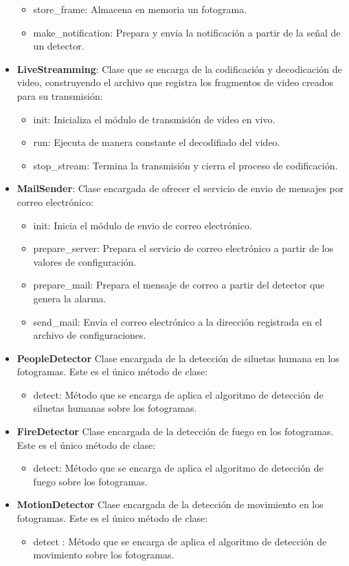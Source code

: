 \begin{itemize}
\begin{itemize}
            \item store\_frame: Almacena en memoria un fotograma.
            \item make\_notification: Prepara y envia la notificación a partir de la señal de un detector.
        \end{itemize}
    \item \textbf{LiveStreamming}: Clase que se encarga de la codificación y decodicación de video, construyendo el archivo que registra los fragmentos de video creados para su transmisión:
        \begin{itemize}
            \item init: Inicializa el módulo de transmisión de video en vivo.
            \item run: Ejecuta de manera constante el decodifiado del video.
            \item stop\_stream: Termina la transmisión y cierra el proceso de codificación.
        \end{itemize}
    \item \textbf{MailSender}: Clase encargada de ofrecer el servicio de envio de mensajes por correo electrónico:
        \begin{itemize}
            \item init: Inicia el módulo de envio de correo electrónico.
            \item prepare\_server: Prepara el servicio de correo electrónico a partir de los valores de configuración.
            \item prepare\_mail: Prepara el mensaje de correo a partir del detector que genera la alarma.
            \item send\_mail: Envia el correo electrónico a la dirección registrada en el archivo de configuraciones.
        \end{itemize}
    \item \textbf{PeopleDetector} Clase encargada de la detección de siluetas humana en los fotogramas. Este es el único método de clase:
        \begin{itemize}
            \item detect: Método que se encarga de aplica el algoritmo de detección de siluetas humanas sobre los fotogramas.
        \end{itemize}
    \item \textbf{FireDetector} Clase encargada de la detección de fuego en los fotogramas. Este es el único método de clase:
        \begin{itemize}
            \item detect: Método que se encarga de aplica el algoritmo de detección de fuego sobre los fotogramas.
        \end{itemize}
    \item \textbf{MotionDetector} Clase encargada de la detección de movimiento en los fotogramas. Este es el único método de clase:
        \begin{itemize}
            \item detect : Método que se encarga de aplica el algoritmo de detección de movimiento sobre los fotogramas.
        \end{itemize}
\end{itemize}


